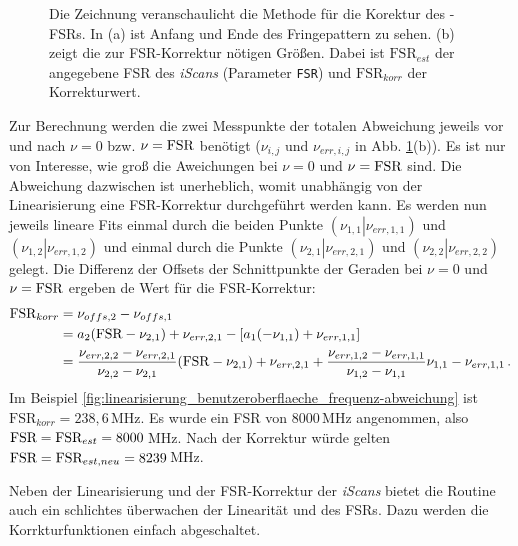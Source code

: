 \begin{figure}[h]
 	\centering
	\caption[\textit{iScan}-FSR-Korrektur -
	Methode]{Die Zeichnung veranschaulicht die Methode für die Korektur des
	-FSRs. In (a) ist Anfang und Ende des
	Fringepattern zu sehen. (b) zeigt die zur
	FSR-Korrektur nötigen Größen. Dabei ist $\text{FSR}_{est}$ der
	angegebene FSR des \textit{iScans} (Parameter
	\lstinline|FSR|) und $\text{FSR}_{korr}$ der
	Korrekturwert.}\label{fig:FSR-korrektur}
\end{figure}
Zur Berechnung werden die zwei Messpunkte der totalen Abweichung jeweils vor und
nach $\nu=0$ bzw. $\nu=\text{\lstinline|FSR|}$ benötigt ($\nu_{i,j}$ und
$\nu_{err,i,j}$ in Abb. \ref{fig:FSR-korrektur}(b)). Es ist nur von Interesse,
wie groß die Aweichungen bei $\nu=0$ und $\nu=\text{\lstinline|FSR|}$ sind. Die Abweichung dazwischen ist
unerheblich, womit unabhängig von der Linearisierung eine FSR-Korrektur
durchgeführt werden kann. Es werden nun jeweils lineare Fits einmal durch die
beiden Punkte $(\left.\nu_{1,1}\right|\nu_{err,1,1})$ und
$(\left.\nu_{1,2}\right|\nu_{err,1,2})$ und einmal durch die Punkte
$(\left.\nu_{2,1}\right|\nu_{err,2,1})$ und
$(\left.\nu_{2,2}\right|\nu_{err,2,2})$ gelegt.
Die Differenz der Offsets der Schnittpunkte der Geraden bei $\nu=0$ und $\nu=\text{\lstinline|FSR|}$ ergeben de Wert für die
FSR-Korrektur:
\begin{equation}\label{eq:FSR_korrektur}
	\begin{split}
		\text{FSR}_{korr}
		&=\nu_{offs,2}-\nu_{offs,1}\\
		&=a_2(\text{\lstinline|FSR|}-\nu_{2,1})+\nu_{err,2,1}-[a_1(-\nu_{1,1})+\nu_{err,1,1}]\\
		&=\frac{\nu_{err,2,2}-\nu_{err,2,1}}{\nu_{2,2}-\nu_{2,1}}(\text{\lstinline|FSR|}-\nu_{2,1})+\nu_{err,2,1}+\frac{\nu_{err,1,2}-\nu_{err,1,1}}{\nu_{1,2}-\nu_{1,1}}\nu_{1,1}-\nu_{err,1,1}\,.
	\end{split}
\end{equation}
Im Beispiel \ref{fig:linearisierung_benutzeroberflaeche_frequenz-abweichung}
ist $\text{FSR}_{korr}=238,6\,$MHz. Es wurde ein FSR von $8000\,$MHz angenommen,
also $\text{\lstinline|FSR|}=\text{FSR}_{est}=8000\,$MHz. Nach der Korrektur
würde gelten $\text{\lstinline|FSR|}=\text{FSR}_{est,neu}=8239\,$MHz.\par
Neben der Linearisierung und der FSR-Korrektur der \textit{iScans} bietet die
Routine auch ein schlichtes überwachen der Linearität und des FSRs. Dazu werden
die Korrkturfunktionen einfach abgeschaltet.

